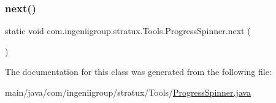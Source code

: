 \subsubsection{\texorpdfstring{next()}{next()}\hspace{0.1cm}{\footnotesize\ttfamily [2/2]}}
{\footnotesize\ttfamily static void com.\+ingeniigroup.\+stratux.\+Tools.\+Progress\+Spinner.\+next (\begin{DoxyParamCaption}{ }\end{DoxyParamCaption})\hspace{0.3cm}{\ttfamily [static]}}



The documentation for this class was generated from the following file\+:\begin{DoxyCompactItemize}
\item 
main/java/com/ingeniigroup/stratux/\+Tools/\hyperlink{_progress_spinner_8java}{Progress\+Spinner.\+java}\end{DoxyCompactItemize}
